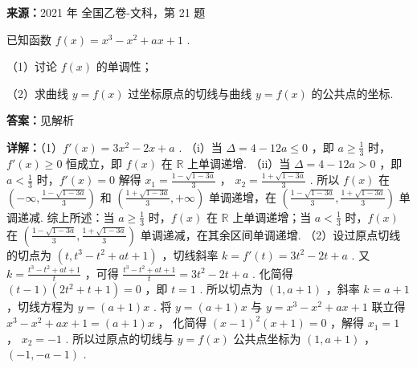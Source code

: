 \begin{question}[points=12]
\textbf{来源：}2021 年 全国乙卷-文科，第 21 题\par
已知函数 $f(x) = x^3 - x^2 + ax + 1$ .

（1）讨论 $f(x)$ 的单调性；

（2）求曲线 $y = f(x)$ 过坐标原点的切线与曲线 $y = f(x)$ 的公共点的坐标.
\begin{solution}
\textbf{答案：}见解析

\textbf{详解：}（1）$f'(x) = 3x^2 - 2x + a$ .
（i）当 $\Delta = 4 - 12a \le 0$ ，即 $a \ge \frac{1}{3}$ 时，$f'(x) \ge 0$ 恒成立，即 $f(x)$ 在 $\mathbb{R}$ 上单调递增.
（ii）当 $\Delta = 4 - 12a > 0$ ，即 $a < \frac{1}{3}$ 时，$f'(x)=0$ 解得 $x_1 = \frac{1-\sqrt{1-3a}}{3}$ ， $x_2 = \frac{1+\sqrt{1-3a}}{3}$ .
所以 $f(x)$ 在 $(-\infty, \frac{1-\sqrt{1-3a}}{3})$ 和 $(\frac{1+\sqrt{1-3a}}{3}, +\infty)$ 单调递增，在 $(\frac{1-\sqrt{1-3a}}{3}, \frac{1+\sqrt{1-3a}}{3})$ 单调递减.
综上所述：当 $a \ge \frac{1}{3}$ 时，$f(x)$ 在 $\mathbb{R}$ 上单调递增；当 $a < \frac{1}{3}$ 时，$f(x)$ 在 $(\frac{1-\sqrt{1-3a}}{3}, \frac{1+\sqrt{1-3a}}{3})$ 单调递减，在其余区间单调递增.
（2）设过原点切线的切点为 $(t, t^3 - t^2 + at + 1)$ ，切线斜率 $k = f'(t) = 3t^2 - 2t + a$ .
又 $k = \frac{t^3 - t^2 + at + 1}{t}$ ，可得 $\frac{t^3 - t^2 + at + 1}{t} = 3t^2 - 2t + a$ .
化简得 $(t-1)(2t^2 + t + 1) = 0$ ，即 $t = 1$ .
所以切点为 $(1, a+1)$ ，斜率 $k = a+1$ ，切线方程为 $y = (a+1)x$ .
将 $y = (a+1)x$ 与 $y = x^3 - x^2 + ax + 1$ 联立得 $x^3 - x^2 + ax + 1 = (a+1)x$ ，
化简得 $(x-1)^2(x+1) = 0$ ，解得 $x_1 = 1$ ， $x_2 = -1$ .
所以过原点的切线与 $y = f(x)$ 公共点坐标为 $(1, a+1)$ ， $(-1, -a-1)$ .
\end{solution}
\end{question}

